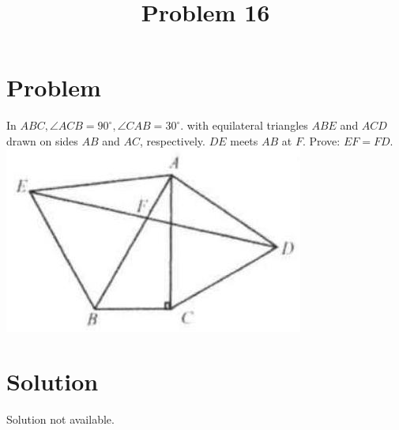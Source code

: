 \documentclass{article}
\title{Problem 16}
\date{}
\begin{document}
\maketitle

\section*{Problem}
In \(A B C, \angle A C B=90^{\circ}, \angle C A B=30^{\circ}\). with equilateral triangles \(A B E\) and \(A C D\) drawn on sides \(A B\) and \(A C\), respectively. \(D E\) meets \(A B\) at \(F\). Prove: \(E F=F D\).\\
\centering
\includegraphics[width=\textwidth]{images/090.jpg}

\section*{Solution}
Solution not available.
\end{document}
